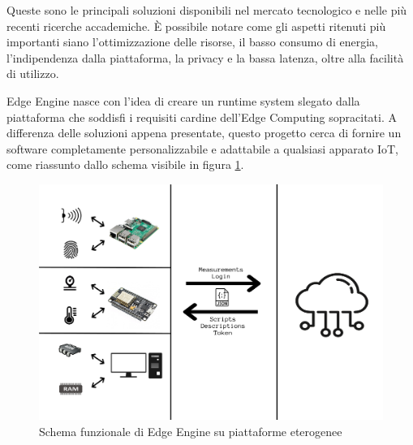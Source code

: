 Queste sono le principali soluzioni disponibili nel mercato tecnologico e nelle più recenti ricerche accademiche. È possibile notare come gli aspetti ritenuti più importanti siano l'ottimizzazione delle risorse, il basso consumo di energia, l'indipendenza dalla piattaforma, la privacy e la bassa latenza, oltre alla facilità di utilizzo.

Edge Engine nasce con l'idea di creare un runtime system slegato dalla piattaforma che soddisfi i requisiti cardine dell'Edge Computing sopracitati. A differenza delle soluzioni appena presentate, questo progetto cerca di fornire un software completamente personalizzabile e adattabile a qualsiasi apparato IoT, come riassunto dallo schema visibile in figura \ref{edgecomplete}.

\begin{figure}
	\centering
	\includegraphics[width=\linewidth]{pics/edgineCP}
	\caption{Schema funzionale di Edge Engine su piattaforme eterogenee}
	\label{edgecomplete}
\end{figure}
